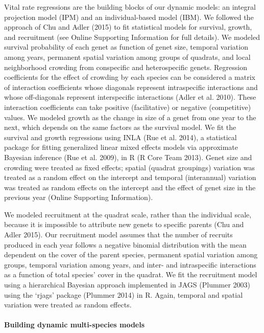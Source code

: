 \documentclass[12pt,]{article}
\begin{document}
Vital rate regressions are the building blocks of our dynamic models: an
integral projection model (IPM) and an individual-based model (IBM). We
followed the approach of Chu and Adler (2015) to fit statistical models
for survival, growth, and recruitment (see Online Supporting Information
for full details). We modeled survival probability of each genet as
function of genet size, temporal variation among years, permanent
spatial variation among groups of quadrats, and local neighborhood
crowding from conspecific and heterospecific genets. Regression
coefficients for the effect of crowding by each species can be
considered a matrix of interaction coefficients whose diagonals
represent intraspecific interactions and whose off-diagonals represent
interspecific interactions (Adler et al. 2010). These interaction
coefficients can take positive (facilitative) or negative (competitive)
values. We modeled growth as the change in size of a genet from one year
to the next, which depends on the same factors as the survival model. We
fit the survival and growth regressions using INLA (Rue et al. 2014), a
statistical package for fitting generalized linear mixed effects models
via approximate Bayesian inference (Rue et al. 2009), in R (R Core Team
2013). Genet size and crowding were treated as fixed effects; spatial
(quadrat groupings) variation was treated as a random effect on the
intercept and temporal (interannual) variation was treated as random
effects on the intercept and the effect of genet size in the previous
year (Online Supporting Information).

We modeled recruitment at the quadrat scale, rather than the individual
scale, because it is impossible to attribute new genets to specific
parents (Chu and Adler 2015). Our recruitment model assumes that the
number of recruits produced in each year follows a negative binomial
distribution with the mean dependent on the cover of the parent species,
permanent spatial variation among groups, temporal variation among
years, and inter- and intraspecific interactions as a function of total
species' cover in the quadrat. We fit the recruitment model using a
hierarchical Bayesian approach implemented in JAGS (Plummer 2003) using
the `rjags' package (Plummer 2014) in R. Again, temporal and spatial
variation were treated as random effects.

\paragraph{Building dynamic multi-species
models}\label{building-dynamic-multi-species-models}
\end{document}
